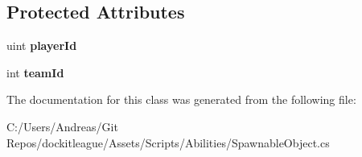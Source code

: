 \subsection*{Protected Attributes}
\begin{DoxyCompactItemize}
\item 
\hypertarget{class_spawnable_object_acc7b4ea3447045ed79ea2e541d03e6bf}{}\label{class_spawnable_object_acc7b4ea3447045ed79ea2e541d03e6bf} 
uint {\bfseries player\+Id}
\item 
\hypertarget{class_spawnable_object_afd19d476587a2ef07873b36e5939c224}{}\label{class_spawnable_object_afd19d476587a2ef07873b36e5939c224} 
int {\bfseries team\+Id}
\end{DoxyCompactItemize}


The documentation for this class was generated from the following file\+:\begin{DoxyCompactItemize}
\item 
C\+:/\+Users/\+Andreas/\+Git Repos/dockitleague/\+Assets/\+Scripts/\+Abilities/Spawnable\+Object.\+cs\end{DoxyCompactItemize}
